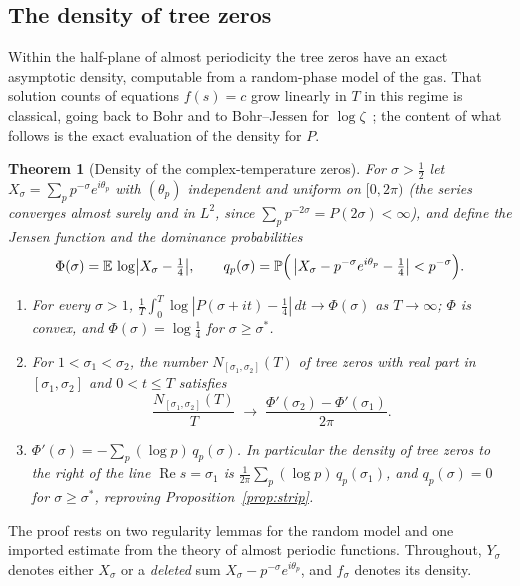 \documentclass[11pt]{article}
\numberwithin{equation}{section}
\theoremstyle{plain}
\newtheorem{theorem}{Theorem}[section]
\theoremstyle{definition}
\theoremstyle{remark}
\begin{document}
\subsection{The density of tree zeros}\label{sec:density}

Within the half-plane of almost periodicity the tree zeros have an exact asymptotic
density, computable from a random-phase model of the gas. That solution counts of
equations $f(s) = c$ grow linearly in $T$ in this regime is classical, going back
to Bohr and to Bohr--Jessen for $\log\zeta$~\cite{bohrjessen,borchsenius}; the
content of what follows is the exact evaluation of the density for $P$.

\begin{theorem}[Density of the complex-temperature zeros]\label{thm:density}
For $\sigma > \tfrac12$ let $X_\sigma = \sum_p p^{-\sigma} e^{i\theta_p}$ with
$(\theta_p)$ independent and uniform on $[0, 2\pi)$ (the series converges almost
surely and in $L^2$, since $\sum_p p^{-2\sigma} = P(2\sigma) < \infty$), and define
the \emph{Jensen function} and the \emph{dominance probabilities}
\[
\Phi(\sigma) = \mathbb{E}\,\log\bigl|X_\sigma - \tfrac14\bigr|,
\qquad
q_p(\sigma) = \mathbb{P}\Bigl(\,\bigl|X_\sigma - p^{-\sigma}e^{i\theta_p} -
\tfrac14\bigr| < p^{-\sigma}\Bigr).
\]
\begin{enumerate}
\item[(i)] For every $\sigma > 1$,
$\frac1T \int_0^T \log|P(\sigma + it) - \tfrac14|\,dt \to \Phi(\sigma)$ as
$T \to \infty$; $\Phi$ is convex, and $\Phi(\sigma) = \log\tfrac14$ for
$\sigma \ge \sigma^{*}$.
\item[(ii)] For $1 < \sigma_1 < \sigma_2$, the number $N_{[\sigma_1,\sigma_2]}(T)$ of
tree zeros with real part in $[\sigma_1, \sigma_2]$ and $0 < t \le T$ satisfies
\[
\frac{N_{[\sigma_1,\sigma_2]}(T)}{T} \;\longrightarrow\;
\frac{\Phi'(\sigma_2) - \Phi'(\sigma_1)}{2\pi}.
\]
\item[(iii)] $\Phi'(\sigma) = -\sum_p (\log p)\, q_p(\sigma)$. In particular the
density of tree zeros to the right of the line $\operatorname{Re} s = \sigma_1$ is
$\frac{1}{2\pi}\sum_p (\log p)\, q_p(\sigma_1)$, and $q_p(\sigma) = 0$ for
$\sigma \ge \sigma^{*}$, reproving Proposition~\ref{prop:strip}.
\end{enumerate}
\end{theorem}

The proof rests on two regularity lemmas for the random model and one imported
estimate from the theory of almost periodic functions. Throughout, $Y_\sigma$ denotes
either $X_\sigma$ or a \emph{deleted} sum $X_\sigma - p^{-\sigma}e^{i\theta_p}$, and
$f_\sigma$ denotes its density.
\end{document}
